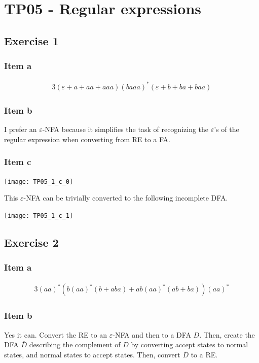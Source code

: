 \setcounter{section}{4}
\section{TP05 - Regular expressions}
{
\renewcommand{\thesubsubsection}{\thesubsection\alph{subsubsection}}
\subsection{Exercise 1}
\subsubsection{Item a}
\begin{alignat*}{3}
	(\varepsilon + a + aa + aaa)(baaa)^*(\varepsilon + b + ba + baa)
\end{alignat*}
\subsubsection{Item b}
I prefer an $\varepsilon$-NFA because it simplifies the task of recognizing the $\varepsilon$'s of the regular expression when converting from RE to a FA.
\subsubsection{Item c}
\begin{center} \texttt{[image: TP05\_1\_c\_0]} \end{center}
This $\varepsilon$-NFA can be trivially converted to the following incomplete DFA.
\begin{center} \texttt{[image: TP05\_1\_c\_1]} \end{center}
\subsection{Exercise 2}
\subsubsection{Item a}
\begin{alignat*}{3}
	 (aa)^* (b  (aa)^* ( b + aba ) + ab (aa)^* ( ab + ba ))(aa)^*
\end{alignat*}
\subsubsection{Item b}
Yes it can. Convert the RE to an $\varepsilon$-NFA and then to a DFA $D$. Then, create the DFA $\overline{D}$ describing the complement of $D$ by converting accept states to normal states, and normal states to accept states. Then, convert $\overline{D}$ to a RE.
\pagebreak
}
